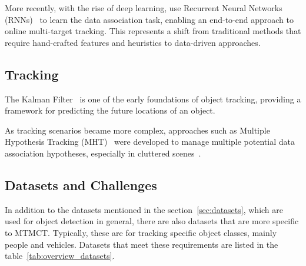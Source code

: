 More recently, with the rise of deep learning, \textcite{Milan16b} use Recurrent Neural Networks (RNNs)~\cite{Rumelhart86} to learn the data association task, enabling an end-to-end approach to online multi-target tracking. This represents a shift from traditional methods that require hand-crafted features and heuristics to data-driven approaches.

\subsection{Tracking}\label{subsec:milestone_tracking}
The Kalman Filter~\cite{Kalman60} is one of the early foundations of object tracking, providing a framework for predicting the future locations of an object.

As tracking scenarios became more complex, approaches such as Multiple Hypothesis Tracking (MHT)~\cite{Blackman04} were developed to manage multiple potential data association hypotheses, especially in cluttered scenes~\cite{Reid79}.

\subsection{Datasets and Challenges}\label{subsec:datasets_and_challenges}
In addition to the datasets mentioned in the section~\ref{sec:datasets}, which are used for object detection in general, there are also datasets that are more specific to MTMCT. Typically, these are for tracking specific object classes, mainly people and vehicles. Datasets that meet these requirements are listed in the table~\ref{tab:overview_datasets}.

